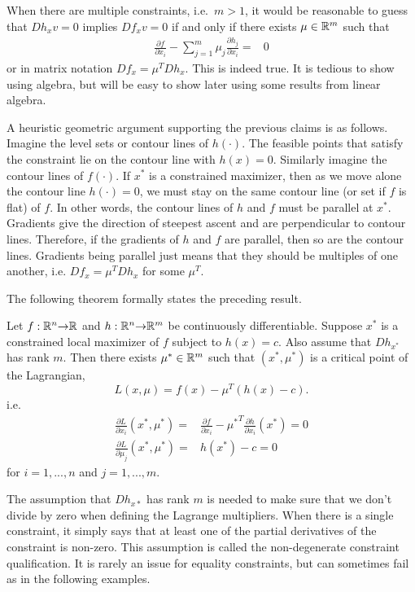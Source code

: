 When there are multiple constraints, i.e.\ $m>1$, it would be
reasonable to guess that $Dh_x v = 0$ implies $Df_x v = 0$ if and only
if there exists $\mu \in \mathbb{R}^m$ such that 
\begin{align*}
  \frac{\partial f}{\partial x_i} - \sum_{j=1}^m \mu_j  \frac{\partial
    h_j}{\partial x_i} = & 0 
\end{align*}
or in matrix notation $Df_x = \mu^T Dh_x$. This is indeed true. It is
tedious to show using algebra, but will be easy to show later using
some results from linear algebra.

A heuristic geometric argument supporting the previous claims is as
follows. Imagine the level sets or contour lines of $h(\cdot)$. The
feasible points that satisfy the constraint lie on the contour line
with $h(x) = 0$. Similarly imagine the contour lines of $f(\cdot)$. If
$x^*$ is a constrained maximizer, then as we move alone the contour
line $h(\cdot) = 0$, we must stay on the same contour line (or set if
$f$ is flat) of $f$. In other words, the contour lines of $h$ and $f$
must be parallel at $x^*$. Gradients give the direction of steepest
ascent and are perpendicular to contour lines. Therefore, if the
gradients of $h$ and $f$ are parallel, then so are the contour
lines. Gradients being parallel just means that they should be
multiples of one another, i.e.  $Df_x = \mu^T Dh_x$ for some $\mu^T$. 

The following theorem formally states the preceding result.
\begin{theorem} \label{thm:econ} Let $f:\mathbb{R}^n {\rightarrow} \mathbb{R}$ and $h: \mathbb{R}^n {\rightarrow}
  \mathbb{R}^m$ be continuously differentiable. Suppose $x^*$ is a constrained
  local maximizer of $f$ subject to $h(x) = c$. Also assume that
  $Dh_{x^*}$ has rank $m$. Then there exists $\mu^* \in \mathbb{R}^m$ such
  that $(x^*, \mu^*)$ is a critical point of the Lagrangian,
  \[ L(x,\mu) = f(x) - \mu^T (h(x) - c). \]
  i.e.
  \begin{align*}
    \frac{\partial L}{\partial x_i}(x^*,\mu^*) = & \frac{\partial
      f}{\partial x_i} - {\mu^*}^T \frac{\partial h}{\partial
      x_i}(x^*) = 0 \\
    \frac{\partial L}{\partial \mu_j}(x^*,\mu^*) = & h(x^*) -
    c = 0
  \end{align*}
  for $i = 1, ..., n$ and $j=1,...,m$.
\end{theorem}
The assumption that $Dh_{x*}$ has rank $m$ is needed to make sure that
we don't divide by zero when defining the Lagrange multipliers. When
there is a single constraint, it simply says that at least one of the
partial derivatives of the constraint is non-zero. This assumption is
called the non-degenerate constraint qualification. It is rarely an
issue for equality constraints, but can sometimes fail as in the
following examples.

